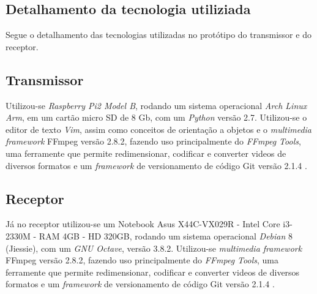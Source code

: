 \begin{apendicesenv}

\partapendices

\chapter{Detalhamento da tecnologia utiliziada}
\label{apen:tec}

    Segue o detalhamento das tecnologias utilizadas no protótipo do transmissor e do receptor.

\section{Transmissor}

Utilizou-se \textit{Raspberry Pi2 Model B}, rodando um sistema operacional \textit{Arch Linux Arm}, em um cartão micro SD de 8 Gb,  com um \textit{Python} versão 2.7.
Utilizou-se o editor de texto \textit{Vim}, assim como conceitos de orientação a objetos e o \textit{multimedia framework} FFmpeg versão 2.8.2, fazendo uso principalmente do \textit{FFmpeg Tools}, uma ferramente que permite redimensionar, codificar e converter videos de diversos formatos e um \textit{framework} de versionamento de código Git versão 2.1.4 .


\section{Receptor}

    Já no receptor utilizou-se um Notebook Asus X44C-VX029R - Intel Core i3-2330M - RAM 4GB - HD 320GB, rodando um sistema operacional \textit{Debian} 8 (Jiessie), com um \textit{GNU Octave}, versão 3.8.2.
Utilizou-se \textit{multimedia framework} FFmpeg versão 2.8.2, fazendo uso principalmente do \textit{FFmpeg Tools}, uma ferramente que permite redimensionar, codificar e converter videos de diversos formatos e um \textit{framework} de versionamento de código Git versão 2.1.4 . 




\end{apendicesenv}
